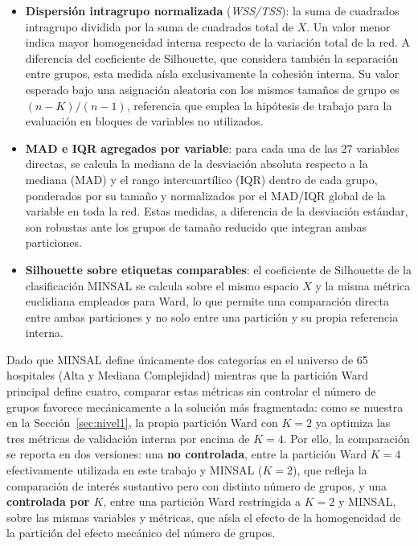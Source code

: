 \begin{itemize}
  \item \textbf{Dispersión intragrupo normalizada} (\textit{WSS/TSS}): la suma
    de cuadrados intragrupo dividida por la suma de cuadrados total de $X$.
    Un valor menor indica mayor homogeneidad interna respecto de la variación
    total de la red. A diferencia del coeficiente de Silhouette, que
    considera también la separación entre grupos, esta medida aísla
    exclusivamente la cohesión interna. Su valor esperado bajo una
    asignación aleatoria con los mismos tamaños de grupo es $(n-K)/(n-1)$,
    referencia que emplea la hipótesis de trabajo para la evaluación en
    bloques de variables no utilizados.
  \item \textbf{MAD e IQR agregados por variable}: para cada una de las 27
    variables directas, se calcula la mediana de la desviación absoluta
    respecto a la mediana (MAD) y el rango intercuartílico (IQR) dentro de
    cada grupo, ponderados por su tamaño y normalizados por el MAD/IQR global
    de la variable en toda la red. Estas medidas, a diferencia de la
    desviación estándar, son robustas ante los grupos de tamaño reducido que
    integran ambas particiones.
  \item \textbf{Silhouette sobre etiquetas comparables}: el coeficiente de
    Silhouette de la clasificación MINSAL se calcula sobre el mismo espacio
    $X$ y la misma métrica euclidiana empleados para Ward, lo que permite una
    comparación directa entre ambas particiones y no solo entre una partición
    y su propia referencia interna.
\end{itemize}

Dado que MINSAL define únicamente dos categorías en el universo de 65
hospitales (Alta y Mediana Complejidad) mientras que la partición Ward
principal define cuatro, comparar estas métricas sin controlar el número de
grupos favorece mecánicamente a la solución más fragmentada: como se muestra
en la Sección~\ref{sec:nivel1}, la propia partición Ward con $K=2$ ya optimiza
las tres métricas de validación interna por encima de $K=4$. Por ello, la
comparación se reporta en dos versiones: una \textbf{no controlada}, entre la
partición Ward $K=4$ efectivamente utilizada en este trabajo y MINSAL ($K=2$),
que refleja la comparación de interés sustantivo pero con distinto número de
grupos, y una \textbf{controlada por $K$}, entre una partición Ward restringida
a $K=2$ y MINSAL, sobre las
mismas variables y métricas, que aísla el efecto de la homogeneidad de la
partición del efecto mecánico del número de grupos.

